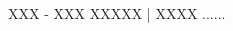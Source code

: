 \documentclass[10pt,A4,english, oneside]{book}
\begin{document}
\begin{paracol}{2}
\begin{rightcolumn}
\begin{minipage}[t]{.55\linewidth}
\end{minipage}


\vspace{4mm}
\heading{\textcolor{kdblue}{\Experience}}\\
\cvevent
{XXX - XXX}
	{XXXXX | XXXX}
	{...\newline...}
    {}
 


\end{rightcolumn}
\end{paracol}
\end{document}
